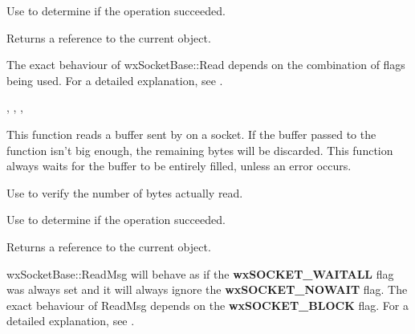 Use  to determine if the operation succeeded.





Returns a reference to the current object.


The exact behaviour of wxSocketBase::Read depends on the combination
of flags being used. For a detailed explanation, see .


, 
, 
, 

%
%
\label{wxsocketbasereadmsg}


This function reads a buffer sent by  
on a socket. If the buffer passed to the function isn't big enough, the
remaining bytes will be discarded. This function always waits for the
buffer to be entirely filled, unless an error occurs.

Use  to verify the number of bytes actually read.

Use  to determine if the operation succeeded.





Returns a reference to the current object.


wxSocketBase::ReadMsg will behave as if the {\bf wxSOCKET\_WAITALL} flag
was always set and it will always ignore the {\bf wxSOCKET\_NOWAIT} flag.
The exact behaviour of ReadMsg depends on the {\bf wxSOCKET\_BLOCK} flag.
For a detailed explanation, see .

